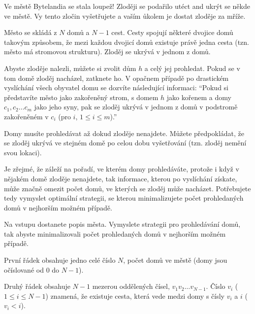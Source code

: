 





Ve městě Bytelandia se stala loupež!
Zloději se podařilo utéct and ukrýt se někde ve městě.
Vy tento zločin vyšetřujete a vaším ůkolem je dostat zloděje za mříže.

Město se skládá z $N$ domů a $N-1$ cest. Cesty spojují některé dvojice domů
takovým způsobem, že mezi každou dvojicí domů existuje právě jedna cesta
(tzn. město má stromovou strukturu).
Zloděj se ukrývá v jednom z domů.

Abyste zloděje nalezli, můžete si zvolit dům $h$ a celý jej prohledat.
Pokud se v tom domě zloděj nacházel, zatknete ho.
V opačnem případě po drastickém vyslíchání všech obyvatel domu se dozvíte následující informaci:
``Pokud si představíte město jako zakořeněný strom, s domem $h$ jako kořenem a domy $c_1, c_2 \ldots c_m$ jako jeho syny,
pak se zloděj ukrývá v jednom z domů v podstromě zakořeněném v $c_i$ (pro $i$, $1 \leq i \leq m$).''

Domy musíte prohledávat až dokud zloděje nenajdete.
Můžete předpokládat, že se zloděj ukrývá ve stejném domě po celou dobu vyšetřování (tzn. zloděj nemění svou lokaci).

Je zřejmé, že záleží na pořadí, ve kterém domy prohledáváte, protože i když v nějakém
domě zloděje nenajdete, tak informace, kterou po vyslíchání získate, může značně
omezit počet domů, ve kterých se zloděj může nacházet.
Potřebujete tedy vymyslet optimální strategii, se kterou minimalizujete počet
prohledaných domů v nejhorším možném případě.


Na vstupu dostanete popis města.
Vymyslete strategii pro prohledávání domů, tak abyste minimalizovali
počet prohledaných domů v nejhorším možném případě.


První řádek obsahuje jedno celé číslo $N$, počet domů ve městě (domy jsou očíslované od $0$ do $N-1$).

Druhý řádek obsahuje $N-1$ mezerou oddělených čísel, $v_1 v_2 \ldots v_{N-1}$.
Číslo $v_i$ ($1 \leq i \leq N-1$) znamená, že existuje cesta, která vede medzi domy s čísly $v_i$ a $i$ ($v_i < i$).

